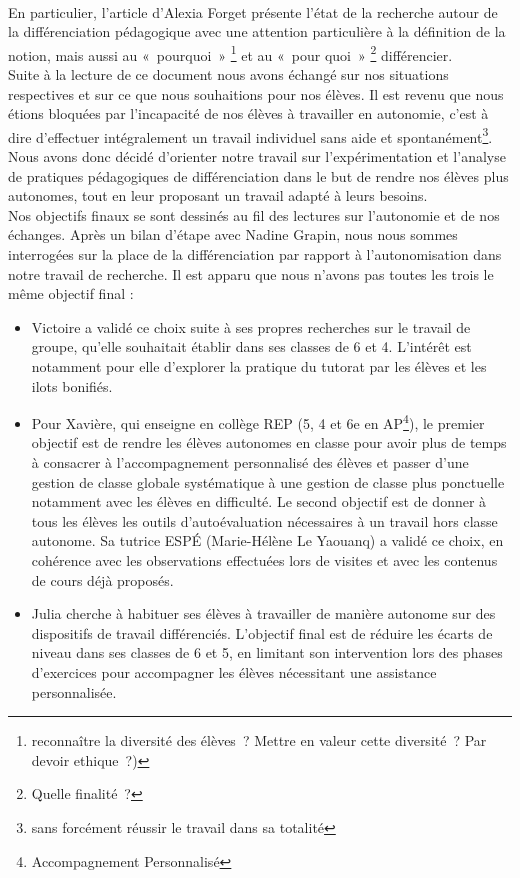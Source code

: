 \paragraph{}En particulier, l'article d'Alexia Forget\cite{cnesco_etat_lieux} présente l'état de la recherche autour de la différenciation pédagogique avec une attention particulière à la définition de la notion, mais aussi au « pourquoi » \footnote{reconnaître la diversité des élèves ? Mettre en valeur cette diversité ? Par devoir ethique ?)} et au « pour quoi » \footnote{Quelle finalité ?} différencier.\\
Suite à la lecture de ce document nous avons échangé sur nos situations respectives et sur ce que nous souhaitions pour nos élèves. Il est revenu que nous étions bloquées par l'incapacité de nos élèves à travailler en autonomie, c'est à dire d'effectuer intégralement un travail individuel sans aide et spontanément\footnote{sans forcément réussir le travail dans sa totalité}. Nous avons donc décidé d'orienter notre travail sur l'expérimentation et l'analyse de pratiques pédagogiques de différenciation dans le but de rendre nos élèves plus autonomes, tout en leur proposant un travail adapté à leurs besoins.\\
Nos objectifs finaux se sont dessinés au fil des lectures sur l'autonomie\cite{Meirieu_autonomie}\cite{ilots_bonifies} et de nos échanges. Après un bilan d'étape avec Nadine Grapin, nous nous sommes interrogées sur la place de la différenciation par rapport à l’autonomisation dans notre travail de recherche. Il est apparu que nous n'avons pas toutes les trois le même objectif final :
\begin{itemize}
	\item Victoire a validé ce choix suite à ses propres recherches sur le travail de groupe, qu’elle souhaitait établir dans ses classes de 6 et 4. L’intérêt est notamment pour elle d’explorer la pratique du tutorat par les élèves et les ilots bonifiés.
	\item Pour Xavière, qui enseigne en collège REP (5, 4 et 6{e} en AP\footnote{Accompagnement Personnalisé}),  le premier objectif est de rendre les élèves autonomes en classe pour avoir plus de temps à consacrer à l’accompagnement personnalisé des élèves et passer d’une gestion de classe globale systématique à une gestion de classe plus ponctuelle notamment avec les élèves en difficulté. Le second objectif est de donner à tous les élèves les outils d’autoévaluation nécessaires à un travail hors classe autonome. Sa tutrice ESPÉ (Marie-Hélène Le Yaouanq) a validé ce choix, en cohérence avec les observations effectuées lors de visites et avec les contenus de cours déjà proposés.
	\item  Julia cherche à habituer ses élèves à travailler de manière autonome sur des dispositifs de travail différenciés. L'objectif final est de réduire les écarts de niveau dans ses classes de 6 et 5, en limitant son intervention lors des phases d’exercices pour accompagner les élèves nécessitant une assistance personnalisée.
\end{itemize}
